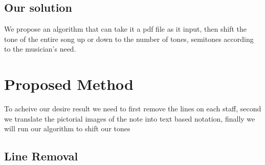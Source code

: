 \documentclass[a4paper,12pt]{report}
\begin{document}
\subsection{Our solution}
We propose an algorithm that can take it a pdf file as it input, then shift the
tone of the entire song up or down to the number of tones, semitones according
to the musician's need. 


\clearpage

\section{Proposed Method}
To acheive our desire result we need to first remove the lines on each staff,
second we translate the pictorial images of the note into text based notation,
finally we will run our algorithm to shift our tones 

\subsection{Line Removal}




\end{document}
